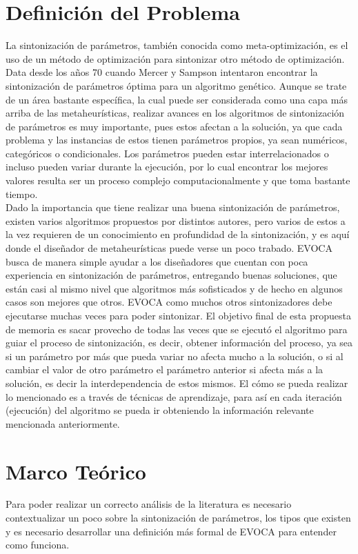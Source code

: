 \documentclass[letter, 10pt]{article}
\begin{document}
\begin{multicols}{2}
\section{Definici\'on del Problema}

La sintonización de parámetros, también conocida como meta-optimización, es el uso de un método de optimización para sintonizar otro método de optimización. Data desde los años 70 cuando Mercer y Sampson \cite{MercerSampson72} intentaron encontrar la sintonización de parámetros óptima para un algoritmo genético. Aunque se trate de un área bastante específica, la cual puede ser considerada como una capa más arriba de las metaheurísticas, realizar avances en los algoritmos de sintonización de parámetros es muy importante, pues estos afectan a la solución, ya que cada problema y las instancias de estos tienen parámetros propios, ya sean numéricos, categóricos o condicionales. Los parámetros pueden estar interrelacionados o incluso pueden variar durante la ejecución, por lo cual encontrar los mejores valores resulta ser un proceso complejo computacionalmente y que toma bastante tiempo. \\

Dado la importancia que tiene realizar una buena sintonización de parámetros, existen varios algoritmos propuestos por distintos autores, pero varios de estos a la vez requieren de un conocimiento en profundidad de la sintonización, y es aquí donde el diseñador de metaheurísticas puede verse un poco trabado. EVOCA busca de manera simple ayudar a los diseñadores que cuentan con poca experiencia en sintonización de parámetros, entregando buenas soluciones, que están casi al mismo nivel que algoritmos más sofisticados y de hecho en algunos casos son mejores que otros. EVOCA como muchos otros sintonizadores debe ejecutarse muchas veces para poder sintonizar. El objetivo final de esta propuesta de memoria es sacar provecho de todas las veces que se ejecutó el algoritmo para guiar el proceso de sintonización, es decir, obtener información del proceso, ya sea si un parámetro por más que pueda variar no afecta mucho a la solución, o si al cambiar el valor de otro parámetro el parámetro anterior si afecta más a la solución, es decir la interdependencia de estos mismos. El cómo se pueda realizar lo mencionado es a través de técnicas de aprendizaje, para así en cada iteración (ejecución) del algoritmo se pueda ir obteniendo la información relevante mencionada anteriormente.

\section{Marco Teórico}
Para poder realizar un correcto análisis de la literatura es necesario contextualizar un poco sobre la sintonización de parámetros, los tipos que existen y es necesario desarrollar una definición más formal de EVOCA para entender como funciona.\\


\end{multicols}
\end{document}
